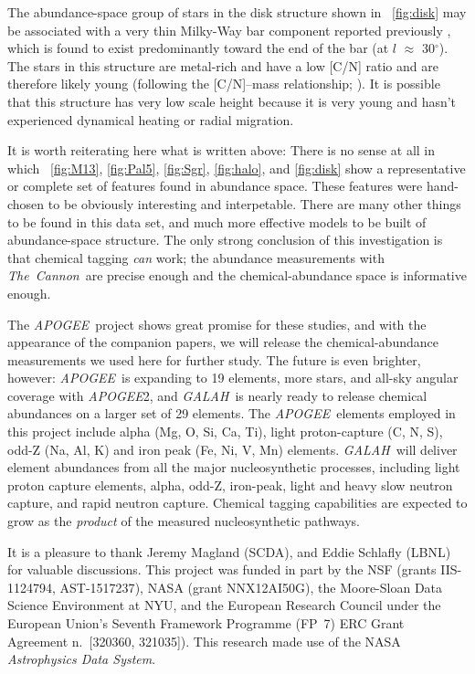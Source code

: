 \documentclass[12pt, letterpaper, preprint]{aastex}
\newcommand{\acronym}[1]{{\small{#1}}}
\newcommand{\project}[1]{\textsl{#1}}
\newcommand{\apogee}{\project{\acronym{APOGEE}}}
\newcommand{\galah}{\project{\acronym{GALAH}}}
\newcommand{\thecannon}{\project{The~Cannon}}
\begin{document}
The abundance-space group of stars in the disk structure shown in
\figurename~\ref{fig:disk} may be associated with a very thin
Milky-Way bar component reported previously \citep{wegg}, which is
found to exist predominantly toward the end of the bar (at $l$
$\approx$ 30$^\circ$).
The stars in this structure are metal-rich and have a low
[C/N] ratio and are therefore likely young (following the [C/N]--mass
relationship; \citealt{martig}).
It is possible that this structure has very low scale height because
it is very young and hasn't experienced dynamical heating or radial
migration.

It is worth reiterating here what is written above:
There is no sense at all in which \figurename~\ref{fig:M13},
\ref{fig:Pal5}, \ref{fig:Sgr}, \ref{fig:halo}, and \ref{fig:disk} show
a representative or complete set of features found in abundance space.
These features were hand-chosen to be obviously interesting and
interpetable.
There are many other things to be found in this data set, and much
more effective models to be built of abundance-space structure.
The only strong conclusion of this investigation is that chemical
tagging \emph{can} work; the abundance measurements with \thecannon\ are
precise enough and the chemical-abundance space is informative enough.

The \apogee\ project shows great promise for these studies, and with
the appearance of the companion papers, we will release the
chemical-abundance measurements we used here for further study.
The future is even brighter, however: \apogee\ is expanding to 19
elements, more stars, and all-sky angular coverage with \apogee2, and
\galah\ is nearly ready to release chemical abundances on a larger set
of 29 elements.
The \apogee\ elements employed in this project include alpha
(Mg, O, Si, Ca, Ti), light proton-capture (C, N, S), odd-Z (Na, Al, K)
and iron peak (Fe, Ni, V, Mn) elements.
\galah\ will deliver element abundances from all the major
nucleosynthetic processes, including light proton capture elements,
alpha, odd-Z, iron-peak, light and heavy slow neutron capture, and
rapid neutron capture.
Chemical tagging capabilities are expected to grow as the
\emph{product} of the measured nucleosynthetic pathways.

\acknowledgements
It is a pleasure to thank
  Jeremy Magland (\acronym{SCDA}), and
  Eddie Schlafly (\acronym{LBNL})
for valuable discussions.
This project was funded in part by
  the \acronym{NSF} (grants \acronym{IIS-1124794}, \acronym{AST-1517237}),
  \acronym{NASA} (grant \acronym{NNX12AI50G}),
  the Moore-Sloan Data Science Environment at \acronym{NYU}, and
  the European Research Council under the
  European Union's Seventh Framework Programme (FP~7)
  \acronym{ERC} Grant Agreement n.~\acronym{[320360, 321035]}).
This research made use of the \acronym{NASA} \project{Astrophysics Data System}.
\end{document}
